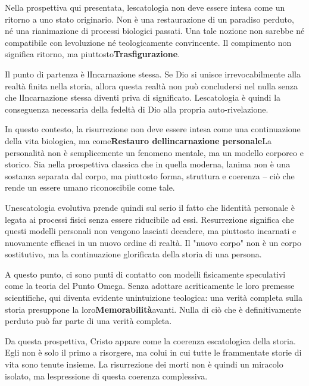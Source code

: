 \documentclass[
]{article}
\begin{document}
Nella prospettiva qui presentata, l\textquotesingle escatologia non deve essere intesa come un ritorno a uno stato originario. Non è una restaurazione di un paradiso perduto, né una rianimazione di processi biologici passati. Una tale nozione non sarebbe né compatibile con l\textquotesingle evoluzione né teologicamente convincente. Il compimento non significa ritorno, ma piuttosto\textbf{Trasfigurazione}.

Il punto di partenza è l\textquotesingle Incarnazione stessa. Se Dio si unisce irrevocabilmente alla realtà finita nella storia, allora questa realtà non può concludersi nel nulla senza che l\textquotesingle Incarnazione stessa diventi priva di significato. L\textquotesingle escatologia è quindi la conseguenza necessaria della fedeltà di Dio alla propria auto-rivelazione.

In questo contesto, la risurrezione non deve essere intesa come una continuazione della vita biologica, ma come\textbf{Restauro dell\textquotesingle incarnazione personale}La personalità non è semplicemente un fenomeno mentale, ma un modello corporeo e storico. Sia nella prospettiva classica che in quella moderna, l\textquotesingle anima non è una sostanza separata dal corpo, ma piuttosto forma, struttura e coerenza -- ciò che rende un essere umano riconoscibile come tale.

Un\textquotesingle escatologia evolutiva prende quindi sul serio il fatto che l\textquotesingle identità personale è legata ai processi fisici senza essere riducibile ad essi. Resurrezione significa che questi modelli personali non vengono lasciati decadere, ma piuttosto incarnati e nuovamente efficaci in un nuovo ordine di realtà. Il "nuovo corpo" non è un corpo sostitutivo, ma la continuazione glorificata della storia di una persona.

A questo punto, ci sono punti di contatto con modelli fisicamente speculativi come la teoria del Punto Omega. Senza adottare acriticamente le loro premesse scientifiche, qui diventa evidente un\textquotesingle intuizione teologica: una verità completa sulla storia presuppone la loro\textbf{Memorabilità}avanti. Nulla di ciò che è definitivamente perduto può far parte di una verità completa.

Da questa prospettiva, Cristo appare come la coerenza escatologica della storia. Egli non è solo il primo a risorgere, ma colui in cui tutte le frammentate storie di vita sono tenute insieme. La risurrezione dei morti non è quindi un miracolo isolato, ma l\textquotesingle espressione di questa coerenza complessiva.
\end{document}
